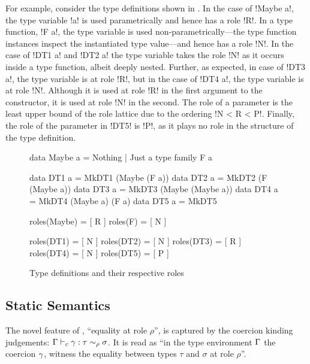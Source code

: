 \documentclass[screen,nonacm,manuscript,review]{acmart} %
\begin{document}
For example, consider the type definitions shown in .
In the case of !Maybe a!, the type variable !a! is used parametrically and hence has a role !R!.
In a type function, !F a!, the type variable is used non-parametrically---the type function instances inspect
the instantiated type value---and hence has a role !N!. In the case of !DT1 a! and !DT2 a! the type variable
takes the role !N! as it occurs inside a type function, albeit deeply nested. Further, as expected,
in case of !DT3 a!, the type variable is at role !R!, but in the case of !DT4 a!, the type variable is
at role !N!. Although it is used at role !R! in the first argument to the constructor, it is used at
role !N! in the second. The role of a parameter is the least upper bound
of the role lattice due to the ordering !N < R < P!. Finally, the role of the parameter
in !DT5! is !P!, as it plays no role in the structure of the type definition.
\begin{figure}[h]
\begin{minipage}{0.5\linewidth}
\begin{CenteredBox}
\begin{code}
data Maybe a = Nothing | Just a
type family F a

data DT1 a = MkDT1 (Maybe (F a))
data DT2 a = MkDT2 (F (Maybe a))
data DT3 a = MkDT3 (Maybe (Maybe a))
data DT4 a = MkDT4 (Maybe a) (F a)
data DT5 a = MkDT5
\end{code}
\end{CenteredBox}
\end{minipage}%
\begin{minipage}{0.5\linewidth}
\begin{CenteredBox}
\begin{code}
roles(Maybe) = [ R ]
roles(F)     = [ N ]

roles(DT1) = [ N ]
roles(DT2) = [ N ]
roles(DT3) = [ R ]
roles(DT4) = [ N ]
roles(DT5) = [ P ]
\end{code}
\end{CenteredBox}
\end{minipage}
\caption{Type definitions and their respective roles}
\label{fig:datatype-roles}
\end{figure}



\subsection{Static Semantics}\label{sec:sfr-static-sem}
The novel feature of \SFR, ``equality at role $\rho$'', is captured by
the coercion kinding judgements: $\Gamma \vdash_{c} \gamma : \tau\sim_\rho\sigma$.
It is read as ``in the type environment $\Gamma$
the coercion $\gamma$, witness the equality between types $\tau$
and $\sigma$ at role $\rho$''.
\end{document}
